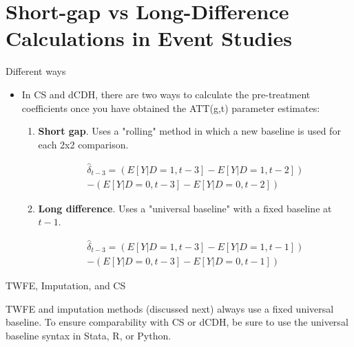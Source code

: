 \documentclass{beamer}
\begin{document}
\section{Short-gap vs Long-Difference Calculations in Event Studies}



\begin{frame}{Different ways}

\begin{itemize}

\item In CS and dCDH, there are two ways to calculate the pre-treatment coefficients once you have obtained the ATT(g,t) parameter estimates:
	\begin{enumerate}
	\item \textbf{Short gap}. Uses a "rolling" method in which a new baseline is used for each 2x2 comparison.
	
	\begin{eqnarray*}
	 \widehat{\delta}_{t-3} = \left( E[Y|D=1, t-3] - E[Y|D=1, t-2] \right) \\
	 - \left( E[Y|D=0, t-3] - E[Y|D=0, t-2] \right)
	 \end{eqnarray*}
	 
	\item \textbf{Long difference}. Uses a "universal baseline" with a fixed baseline at \( t-1 \).
	
	\begin{eqnarray*}
	 \widehat{\delta}_{t-3} = \left( E[Y|D=1, t-3] - E[Y|D=1, t-1] \right) \\
	 - \left( E[Y|D=0, t-3] - E[Y|D=0, t-1] \right)
	 \end{eqnarray*}

	\end{enumerate}
\end{itemize}

\end{frame}

\begin{frame}{TWFE, Imputation, and CS}

TWFE and imputation methods (discussed next) always use a fixed universal baseline. To ensure comparability with CS or dCDH, be sure to use the universal baseline syntax in Stata, R, or Python.

\end{frame}
\end{document}
